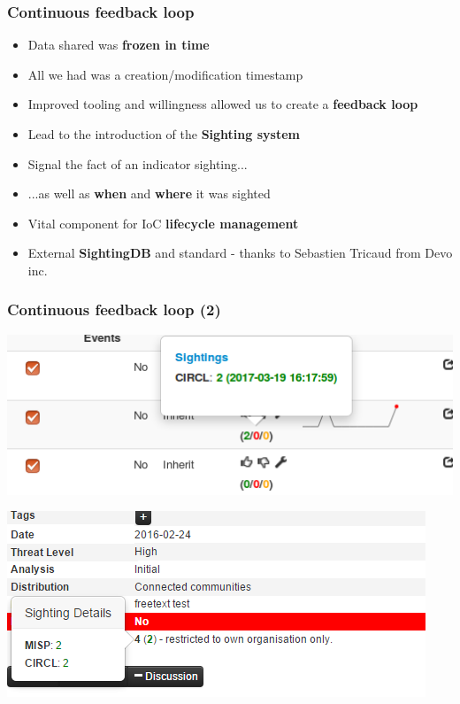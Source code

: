 \begin{frame}
  \frametitle{Continuous feedback loop}
  \begin{itemize}		  
    \item Data shared was {\bf frozen in time}
    \item All we  had was a creation/modification timestamp
    \item Improved tooling and willingness allowed us to create a {\bf feedback loop}
    \item Lead to the introduction of the {\bf Sighting system}
    \item Signal the fact of an indicator sighting...
    \item ...as well as {\bf when} and {\bf where} it was sighted
    \item Vital component for IoC {\bf lifecycle management}
    \item External {\bf SightingDB} and standard - thanks to Sebastien Tricaud from Devo inc.
  \end{itemize}
\end{frame}

\begin{frame}
  \frametitle{Continuous feedback loop (2)}
  \begin{center}
    \includegraphics[scale=0.5]{sighting-n.png}
  \end{center}
  \begin{center}
    \includegraphics[scale=0.60]{Sightings2.PNG}
  \end{center}  
\end{frame}

